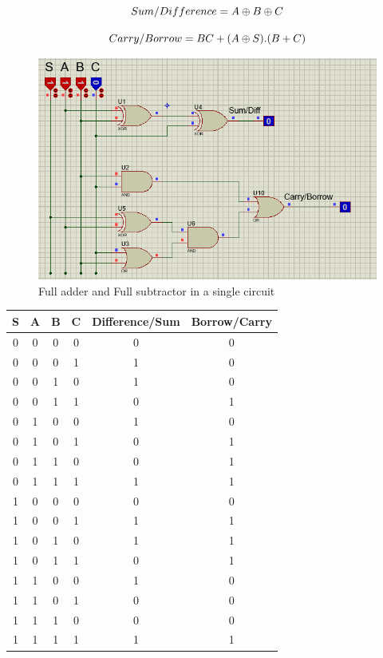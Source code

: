 \documentclass[a4paper, 12pt]{article}
\begin{document}
\begin{equation}
	Sum/Difference = A \oplus B \oplus C \\
\end{equation}

\begin{equation}
	Carry/Borrow = BC + (A \oplus S).(B+C) \\
\end{equation}

\begin{figure}[h]
	\centering
	\includegraphics[scale=0.6]{full-adder-sub.png}
	\caption{Full adder and Full subtractor in a single circuit}
\end{figure}
\begin{center}
	\begin{tabular}[h]{|c|c|c|c|c|c|}
	\hline
	S & A & B & C & Difference/Sum & Borrow/Carry \\
	\hline
	0 & 0 & 0 & 0 & 0 & 0 \\
	0 & 0 & 0 & 1 & 1 & 0 \\
	0 & 0 & 1 & 0 & 1 & 0 \\
	0 & 0 & 1 & 1 & 0 & 1 \\
	0 & 1 & 0 & 0 & 1 & 0 \\
	0 & 1 & 0 & 1 & 0 & 1 \\
	0 & 1 & 1 & 0 & 0 & 1 \\
	0 & 1 & 1 & 1 & 1 & 1 \\
	1 & 0 & 0 & 0 & 0 & 0 \\
	1 & 0 & 0 & 1 & 1 & 1 \\
	1 & 0 & 1 & 0 & 1 & 1 \\
	1 & 0 & 1 & 1 & 0 & 1 \\
	1 & 1 & 0 & 0 & 1 & 0 \\
	1 & 1 & 0 & 1 & 0 & 0 \\
	1 & 1 & 1 & 0 & 0 & 0 \\
	1 & 1 & 1 & 1 & 1 & 1 \\
	\hline
	\end{tabular}
\end{center}
\pagebreak
\end{document}
